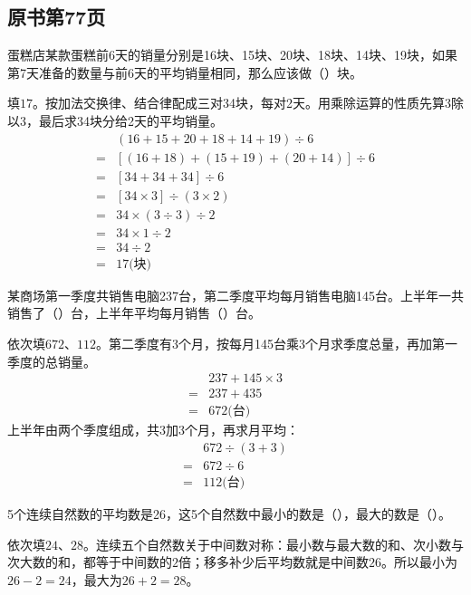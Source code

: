 

\subsection*{原书第77页}

蛋糕店某款蛋糕前6天的销量分别是16块、15块、20块、18块、14块、19块，如果第7天准备的数量与前6天的平均销量相同，那么应该做（\hspace{1.8em}）块。\par
\begin{BookAnswer}
填\(17\)。按加法交换律、结合律配成三对34块，每对2天。用乘除运算的性质先算3除以3，最后求34块分给2天的平均销量。\[\begin{aligned}&(16+15+20+18+14+19)\div6\\={}&[(16+18)+(15+19)+(20+14)]\div6\\={}&[34+34+34]\div6\\={}&[34\times3]\div(3\times2)\\={}&34\times(3\div3)\div2\\={}&34\times1\div2\\={}&34\div2\\={}&17\text{(块)}\end{aligned}\]
\end{BookAnswer}

某商场第一季度共销售电脑237台，第二季度平均每月销售电脑145台。上半年一共销售了（\hspace{1.8em}）台，上半年平均每月销售（\hspace{1.8em}）台。\par
\begin{BookAnswer}
依次填\(672\)、\(112\)。第二季度有3个月，按每月145台乘3个月求季度总量，再加第一季度的总销量。\[\begin{aligned}&237+145\times3\\={}&237+435\\={}&672\text{(台)}\end{aligned}\]上半年由两个季度组成，共3加3个月，再求月平均：\[\begin{aligned}&672\div(3+3)\\={}&672\div6\\={}&112\text{(台)}\end{aligned}\]
\end{BookAnswer}

5个连续自然数的平均数是26，这5个自然数中最小的数是（\hspace{1.8em}），最大的数是（\hspace{1.8em}）。\par
\begin{BookAnswer}
依次填\(24\)、\(28\)。连续五个自然数关于中间数对称：最小数与最大数的和、次小数与次大数的和，都等于中间数的\(2\)倍；移多补少后平均数就是中间数\(26\)。所以最小为\(26-2=24\)，最大为\(26+2=28\)。
\end{BookAnswer}

